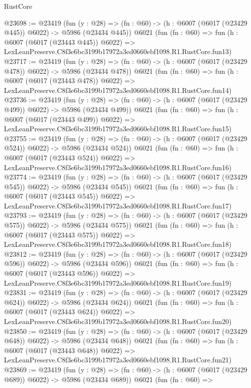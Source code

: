 \begin{lexlean}{RustCore}
\begin{coremodule}
@23698 := @23419
    (fun (y : @28) => (fn : @60) -> (h : @6007 (@6017 (@23429 @445)) @6022) -> @5986 (@23434 @445))
    @6021
    (fun (fn : @60) =>
    fun (h : @6007 (@6017 (@23443 @445)) @6022) =>
    LexLeanPreserve.C8f3e6bc3199b17972a3ed0660ebf1098.R1.RustCore.fun13)
@23717 := @23419
    (fun (y : @28) => (fn : @60) -> (h : @6007 (@6017 (@23429 @478)) @6022) -> @5986 (@23434 @478))
    @6021
    (fun (fn : @60) =>
    fun (h : @6007 (@6017 (@23443 @478)) @6022) =>
    LexLeanPreserve.C8f3e6bc3199b17972a3ed0660ebf1098.R1.RustCore.fun14)
@23736 := @23419
    (fun (y : @28) => (fn : @60) -> (h : @6007 (@6017 (@23429 @499)) @6022) -> @5986 (@23434 @499))
    @6021
    (fun (fn : @60) =>
    fun (h : @6007 (@6017 (@23443 @499)) @6022) =>
    LexLeanPreserve.C8f3e6bc3199b17972a3ed0660ebf1098.R1.RustCore.fun15)
@23755 := @23419
    (fun (y : @28) => (fn : @60) -> (h : @6007 (@6017 (@23429 @524)) @6022) -> @5986 (@23434 @524))
    @6021
    (fun (fn : @60) =>
    fun (h : @6007 (@6017 (@23443 @524)) @6022) =>
    LexLeanPreserve.C8f3e6bc3199b17972a3ed0660ebf1098.R1.RustCore.fun16)
@23774 := @23419
    (fun (y : @28) => (fn : @60) -> (h : @6007 (@6017 (@23429 @545)) @6022) -> @5986 (@23434 @545))
    @6021
    (fun (fn : @60) =>
    fun (h : @6007 (@6017 (@23443 @545)) @6022) =>
    LexLeanPreserve.C8f3e6bc3199b17972a3ed0660ebf1098.R1.RustCore.fun17)
@23793 := @23419
    (fun (y : @28) => (fn : @60) -> (h : @6007 (@6017 (@23429 @575)) @6022) -> @5986 (@23434 @575))
    @6021
    (fun (fn : @60) =>
    fun (h : @6007 (@6017 (@23443 @575)) @6022) =>
    LexLeanPreserve.C8f3e6bc3199b17972a3ed0660ebf1098.R1.RustCore.fun18)
@23812 := @23419
    (fun (y : @28) => (fn : @60) -> (h : @6007 (@6017 (@23429 @596)) @6022) -> @5986 (@23434 @596))
    @6021
    (fun (fn : @60) =>
    fun (h : @6007 (@6017 (@23443 @596)) @6022) =>
    LexLeanPreserve.C8f3e6bc3199b17972a3ed0660ebf1098.R1.RustCore.fun19)
@23831 := @23419
    (fun (y : @28) => (fn : @60) -> (h : @6007 (@6017 (@23429 @624)) @6022) -> @5986 (@23434 @624))
    @6021
    (fun (fn : @60) =>
    fun (h : @6007 (@6017 (@23443 @624)) @6022) =>
    LexLeanPreserve.C8f3e6bc3199b17972a3ed0660ebf1098.R1.RustCore.fun20)
@23850 := @23419
    (fun (y : @28) => (fn : @60) -> (h : @6007 (@6017 (@23429 @648)) @6022) -> @5986 (@23434 @648))
    @6021
    (fun (fn : @60) =>
    fun (h : @6007 (@6017 (@23443 @648)) @6022) =>
    LexLeanPreserve.C8f3e6bc3199b17972a3ed0660ebf1098.R1.RustCore.fun21)
@23869 := @23419
    (fun (y : @28) => (fn : @60) -> (h : @6007 (@6017 (@23429 @689)) @6022) -> @5986 (@23434 @689))
    @6021
    (fun (fn : @60) =>

\end{coremodule}
\end{lexlean}

